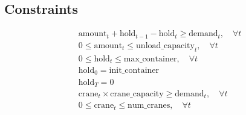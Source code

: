 \documentclass{article}
\begin{document}
\subsection*{Constraints}
\begin{align*}
    & \text{amount}_t + \text{hold}_{t-1} - \text{hold}_{t} \geq \text{demand}_{t}, \quad \forall t \\
    & 0 \leq \text{amount}_{t} \leq \text{unload\_capacity}_{t}, \quad \forall t \\
    & 0 \leq \text{hold}_{t} \leq \text{max\_container}, \quad \forall t \\
    & \text{hold}_0 = \text{init\_container} \\
    & \text{hold}_{T} = 0 \\
    & \text{crane}_t \times \text{crane\_capacity} \geq \text{demand}_{t}, \quad \forall t \\
    & 0 \leq \text{crane}_{t} \leq \text{num\_cranes}, \quad \forall t
\end{align*}
\end{document}
